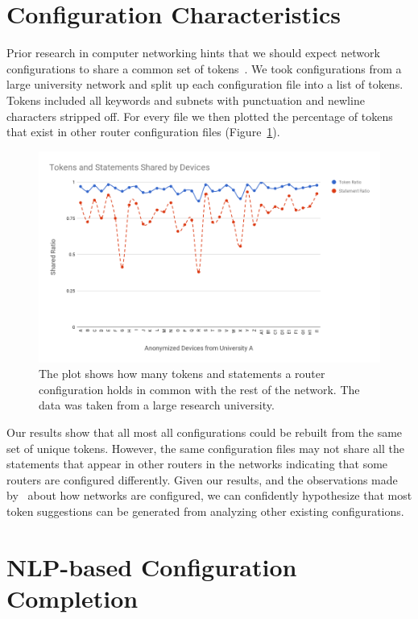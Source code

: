 \section{Configuration Characteristics}

Prior research in computer networking hints that we should expect network configurations to share a common set of tokens~\cite{compelxity}. We took configurations from a large university network and split up each configuration file into a list of tokens. Tokens included all keywords and subnets with punctuation and newline characters stripped off. For every file we then plotted the percentage of tokens that exist in other router configuration files (Figure~\ref{fig:chart}).\\

\begin{figure}
	\centering
	\includegraphics[width=\columnwidth]{chart.png}
	\caption{The plot shows how many tokens and statements a router configuration holds in common with the rest of the network. The data was taken from a large research university.}
    \label{fig:chart}
\end{figure}

Our results show that all most all configurations could be rebuilt from the same set of unique tokens. However, the same configuration files may not share all the statements that appear in other routers in the networks indicating that some routers are configured differently. Given our results, and the observations made by~\cite{complexity} about how networks are configured, we can confidently hypothesize that most token suggestions can be generated from analyzing other existing configurations.\\


\section{NLP-based Configuration Completion}

